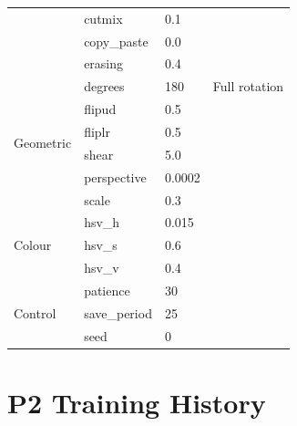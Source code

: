 \documentclass[12pt, titlepage]{article}
\begin{document}
\begin{table}[H]
\begin{tabular}{@{}llll@{}}
                      & cutmix             & 0.1            &                       \\
                      & copy\_paste        & 0.0            &                       \\
                      & erasing            & 0.4            &                       \\
    \midrule
    \multirow{6}{*}{Geometric}
                      & degrees            & 180            & Full rotation         \\
                      & flipud             & 0.5            &                       \\
                      & fliplr             & 0.5            &                       \\
                      & shear              & 5.0            &                       \\
                      & perspective        & 0.0002         &                       \\
                      & scale              & 0.3            &                       \\
    \midrule
    \multirow{3}{*}{Colour}
                      & hsv\_h             & 0.015          &                       \\
                      & hsv\_s             & 0.6            &                       \\
                      & hsv\_v             & 0.4            &                       \\
    \midrule
    \multirow{3}{*}{Control}
                      & patience           & 30             &                       \\
                      & save\_period       & 25             &                       \\
                      & seed               & 0              &                       \\
    \bottomrule
  \end{tabular}
\end{table}

\section{P2 Training History}
\label{app:p2_history}
\end{document}
